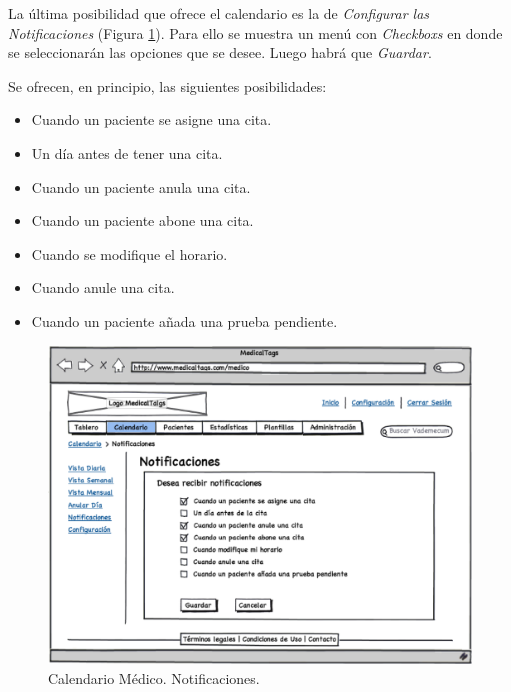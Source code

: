 \documentclass[a4paper,oneside,11pt]{book}
\begin{document}
			La última posibilidad que ofrece el calendario es la de \textit{Configurar las Notificaciones} (Figura \ref{fig:calendario_notificaciones}). Para ello se muestra un menú con \textit{Checkboxs} en donde se seleccionarán las opciones que se desee. Luego habrá que \textit{Guardar}. 
			
			Se ofrecen, en principio, las siguientes posibilidades:
			\begin{itemize}
				\item Cuando un paciente se asigne una cita.
				\item Un día antes de tener una cita.
				\item Cuando un paciente anula una cita.
				\item Cuando un paciente abone una cita.
				\item Cuando se modifique el horario.
				\item Cuando anule una cita.
				\item Cuando un paciente añada una prueba pendiente.
			\end{itemize}
			
			
			\begin{figure}[H]
			  \centering
			    \includegraphics[width=12cm]{img/eps/16_Calendario_Medico_Notificaciones.eps}
			  \caption{Calendario Médico. Notificaciones.}
			  \label{fig:calendario_notificaciones}
			\end{figure}
			
			
		
\end{document}
